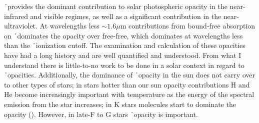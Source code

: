 \h\ provides the dominant contribution to solar photospheric opacity
in the near-infrared and visible regimes, as well as a significant
contribution in the near-ultraviolet.  At wavelengths less $\sim
1.6 \mu$m contributions from bound-free absorption on \h\ dominates
the opacity over free-free, which dominates at wavelengths less than
the \h\ ionization cutoff.  The examination and calculation of these
opacities have had a long history and are well quantified and
understood.  From what I understand there is little-to-no work to be
done in a solar context in regard to \h\ opacities.  %
Additionally, the dominance of \h\ opacity in the sun does not carry
over to other types of stars; in stars hotter than our sun opacity
contributions H and He become increasingly important with temperature
as the energy of the spectral emission from the star increases; in K
stars molecules start to dominate the opacity
(\citealt{collins1989}). However, in late-F to G stars \h\ opacity is
important. 
